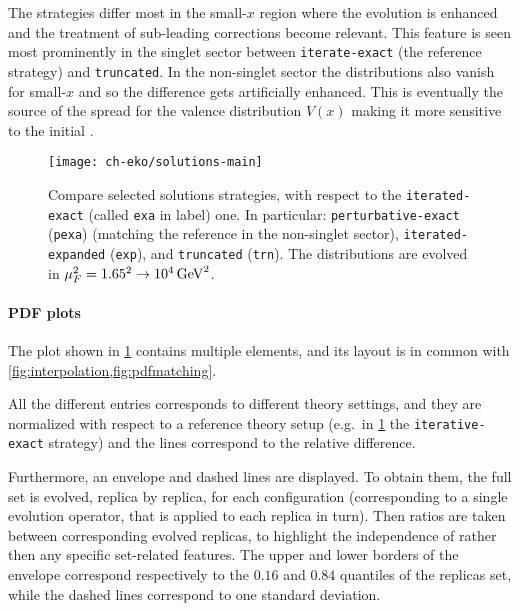 The strategies differ most in the small-$x$ region where the \pdf{} evolution is
enhanced and the treatment of sub-leading corrections become relevant.
This feature is seen most prominently in the singlet sector between
\texttt{iterate-exact} (the reference strategy) and \texttt{truncated}.
In the non-singlet sector the distributions also vanish for small-$x$
and so the difference gets artificially enhanced.
This is eventually the source of the spread for the valence distribution $V(x)$
making it more sensitive to the initial \pdf{}.

\begin{figure}
    \centering
    \texttt{[image: ch-eko/solutions-main]}
    \caption{Compare selected solutions strategies, with respect to the
        \texttt{iterated-exact} (called \texttt{exa} in label) one. In
        particular: \texttt{perturbative-exact} (\texttt{pexa}) (matching
        the reference in the non-singlet sector),
        \texttt{iterated-expanded} (\texttt{exp}), and \texttt{truncated}
        (\texttt{trn}).
        The distributions are evolved in $\muF^2=\SI[parse-numbers=false]{1.65^2\to 10^4}{\GeV^2}$.}
    \label{fig:eko/solutions}
\end{figure}

\paragraph{PDF plots} The \pdf{} plot shown in \cref{fig:eko/solutions} contains
multiple elements, and its layout is in common with
\cref{fig:interpolation,fig:pdfmatching}.

All the different entries corresponds to different theory settings, and they
are normalized with respect to a reference theory setup
(e.g.\ in \cref{fig:eko/solutions} the \texttt{iterative-exact} strategy)
and the lines correspond to the relative difference.

Furthermore, an envelope and dashed lines are displayed.
To obtain them, the full \pdf{} set is evolved, replica by replica, for each
configuration (corresponding to a single evolution operator, that is applied to
each replica in turn).
Then ratios are taken between corresponding evolved replicas, to highlight
the \pdf{} independence of \eko{} rather then any specific set-related features.
The upper and lower borders of the envelope correspond respectively
to the $0.16$ and $0.84$ quantiles of the replicas set,
while the dashed lines correspond to one standard deviation.
